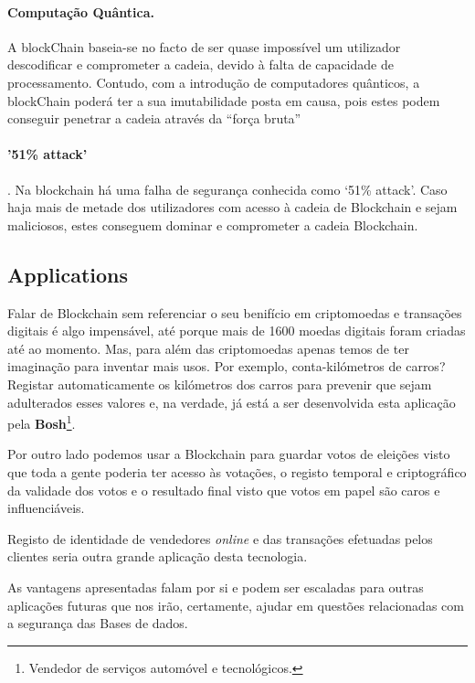 \documentclass{llncs}
\begin{document}
 \paragraph{\textbf{Computação Quântica.}}
 A blockChain baseia-se no facto de ser quase impossível um utilizador descodificar e comprometer a cadeia, devido à falta de capacidade de processamento. Contudo, com a introdução de computadores quânticos, a blockChain poderá ter a sua imutabilidade posta em causa, pois estes podem conseguir penetrar a cadeia através da “força bruta”

 \paragraph{\textbf{'51\% attack'}}. Na blockchain há uma falha de segurança conhecida como ‘51\% attack’. Caso haja mais de metade dos utilizadores com acesso à cadeia de Blockchain e sejam maliciosos, estes conseguem dominar e comprometer a cadeia Blockchain.




\subsection{Applications}

    Falar de Blockchain sem referenciar o seu benifício em criptomoedas e transações digitais é algo impensável, até porque mais de 1600 moedas digitais foram criadas até ao momento.
    Mas, para além das criptomoedas apenas temos de ter imaginação para inventar mais usos. Por exemplo, conta-kilómetros de carros? Registar automaticamente os kilómetros dos carros para prevenir que sejam adulterados esses valores e, na verdade, já está a ser desenvolvida esta aplicação pela \textbf{Bosh}\footnote{Vendedor de serviços automóvel e tecnológicos.}. \par
    
    Por outro lado podemos usar a Blockchain para guardar votos de eleições visto que toda a gente poderia ter acesso às votações, o registo temporal e criptográfico da validade dos votos e o resultado final visto que votos em papel são caros e influenciáveis.

    Registo de identidade de vendedores \textit{online} e das transações efetuadas pelos clientes seria outra grande aplicação desta tecnologia.
    
    As vantagens apresentadas falam por si e podem ser escaladas para outras aplicações futuras que nos irão, certamente, ajudar em questões relacionadas com a segurança das Bases de dados.
\end{document}
